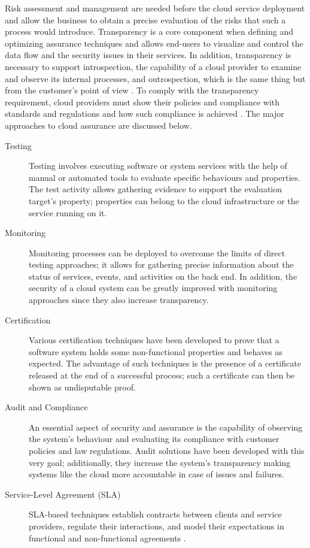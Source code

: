 Risk assessment and management are needed before the cloud service deployment and allow the business to obtain a precise evaluation of the risks that such a process would introduce. Transparency is a core component when defining and optimizing assurance techniques and allows end-users to visualize and control the data flow and the security issues in their services. In addition, transparency is necessary to support introspection, the capability of a cloud provider to examine and observe its internal processes, and outrospection, which is the same thing but from the customer's point of view \cite{ardagna2014management}. To comply with the transparency requirement, cloud providers must show their policies and compliance with standards and regulations and how such compliance is achieved \cite{macneil2006comply}. The major approaches to cloud assurance are discussed below.
\begin{description}
    \item[Testing]
    Testing involves executing software or system services with the help of manual or automated tools to evaluate specific behaviours and properties. The test activity allows gathering evidence to support the evaluation target's property; properties can belong to the cloud infrastructure or the service running on it.

    \item[Monitoring]
    Monitoring processes can be deployed to overcome the limits of direct testing approaches; it allows for gathering precise information about the status of services, events, and activities on the back end. In addition, the security of a cloud system can be greatly improved with monitoring approaches since they also increase transparency.

    \item[Certification]
    Various certification techniques have been developed to prove that a software system holds some non-functional properties and behaves as expected. The advantage of such techniques is the presence of a certificate released at the end of a successful process; such a certificate can then be shown as undisputable proof.
    
    \item[Audit and Compliance]
    An essential aspect of security and assurance is the capability of observing the system's behaviour and evaluating its compliance with customer policies and law regulations. Audit solutions have been developed with this very goal; additionally, they increase the system's transparency making systems like the cloud more accountable in case of issues and failures.
    
    \item[Service-Level Agreement (SLA)]
    SLA-based techniques establish contracts between clients and service providers, regulate their interactions, and model their expectations in functional and non-functional agreements \cite{article}.

\end{description}






